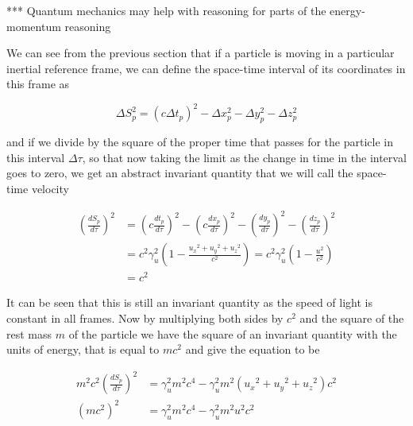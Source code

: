 *** Quantum mechanics may help with reasoning for parts of the energy-momentum reasoning


We can see from the previous section that if a particle is moving in a particular inertial reference frame, we can define the space-time interval of its coordinates in this frame as

\begin{equation}
	\Delta S_p^2 = (c\Delta {t}_p)^2 -\Delta x_p^2 -\Delta y_p^2 -\Delta z_p^2
\end{equation}

and if we divide by the square of the proper time that passes for the particle in this interval $\Delta\tau$, so that now taking the limit as the change in time in the interval goes to zero, we get an abstract invariant quantity that we will call the space-time velocity

\begin{equation}
	\begin{aligned}
		\left(\frac{dS_p}{d\tau}\right)^2 & =  \left(c\frac{{{dt}_{p}}}{d\tau}\right)^2 - \left(c\frac{dx_p}{d\tau}\right)^2 - \left(\frac{dy_p}{d\tau}\right)^2 - \left(\frac{dz_p}{d\tau}\right)^2 \\
		                                  & = c^2\gamma_{u}^2 \left( 1 - \frac{{{u}_{x}}^2 + {{u}_{y}}^2 + {{u}_{z}}^2}{c^2} \right) = c^2\gamma_{u}^2 \left( 1 - \frac{u^2}{c^2} \right)                        \\
		                                  & = c^2
	\end{aligned}
\end{equation}

It can be seen that this is still an invariant quantity as the speed of light is constant in all frames.
Now by multiplying both sides by $c^2$ and the square of the rest mass $m$ of the particle we have the square of an invariant quantity with the units of energy, that is equal to $mc^2$ and give the equation to be

\begin{equation}
	\label{eq: energy-momentum derivation}
	\begin{aligned}
		m^2 c^2 \left(\frac{dS_p}{d\tau}\right)^2 & =  \gamma_{u}^2 m^2 c^4 - \gamma_{u}^2 m^2 \left( {{u}_{x}}^2 + {{u}_{y}}^2 + {{u}_{z}}^2 \right) c^2 \\
		(mc^2)^2                                  & =  \gamma_{u}^2 m^2 c^4 - \gamma_{u}^2 m^2 u^2 c^2
	\end{aligned}
\end{equation}

